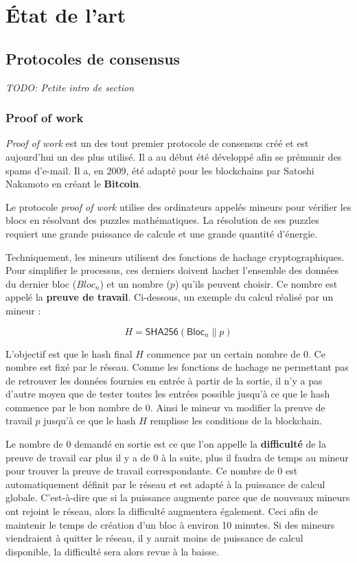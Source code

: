 \chapter{État de l'art}
\label{ch:etat_art}

\section{Protocoles de consensus}

\textit{TODO: Petite intro de section}

\subsection{Proof of work}
\label{consensus:pow}

\textit{Proof of work} est un des tout premier protocole de consensus créé et est aujourd'hui un des plus utilisé. Il a au début été développé afin se prémunir des spams d'e-mail. Il a, en 2009, été adapté pour les blockchains par Satoshi Nakamoto en créant le \textbf{Bitcoin}.

Le protocole \textit{proof of work} utilise des ordinateurs appelés mineurs pour vérifier les blocs en résolvant des puzzles mathématiques. La résolution de ses puzzles requiert une grande puissance de calcule et une grande quantité d'énergie.

Techniquement, les mineurs utilisent des fonctions de hachage cryptographiques. Pour simplifier le processus, ces derniers doivent hacher l'ensemble des données du dernier bloc ($Bloc_n$) et un nombre ($p$) qu'ils peuvent choisir. Ce nombre est appelé la \textbf{preuve de travail}. Ci-dessous, un exemple du calcul réalisé par un mineur :

\begin{equation*}
    H = \textsf{SHA256}(\textsf{Bloc}_n \| p)
\end{equation*}

L'objectif est que le hash final $H$ commence par un certain nombre de 0. Ce nombre est fixé par le réseau. Comme les fonctions de hachage ne permettant pas de retrouver les données fournies en entrée à partir de la sortie, il n'y a pas d'autre moyen que de tester toutes les entrées possible jusqu'à ce que le hash commence par le bon nombre de 0. Ainsi le mineur va modifier la preuve de travail $p$ jusqu'à ce que le hash $H$ remplisse les conditions de la blockchain. 

Le nombre de 0 demandé en sortie est ce que l'on appelle la \textbf{difficulté} de la preuve de travail car plus il y a de 0 à la suite, plus il faudra de temps au mineur pour trouver la preuve de travail correspondante. Ce nombre de 0 est automatiquement définit par le réseau et est adapté à la puissance de calcul globale. C'est-à-dire que si la puissance augmente parce que de nouveaux mineurs ont rejoint le réseau, alors la difficulté augmentera également. Ceci afin de maintenir le temps de création d'un bloc à environ 10 minutes. Si des mineurs viendraient à quitter le réseau, il y aurait moins de puissance de calcul disponible, la difficulté sera alors revue à la baisse.

